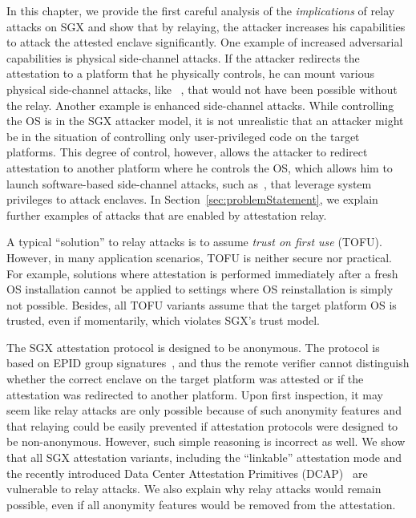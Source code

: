 In this chapter, we provide the first careful analysis of the \emph{implications} of relay attacks on SGX and show that by relaying, the attacker increases his capabilities to attack the attested enclave significantly. One example of increased adversarial capabilities is physical side-channel attacks. If the attacker redirects the attestation to a platform that he physically controls, he can mount various physical side-channel attacks, like ~\cite{genkin2016physical,wang2006covert,gandolfi2001electromagnetic, shamir2004acoustic}, that would not have been possible without the relay. Another example is enhanced side-channel attacks. While controlling the OS is in the SGX attacker model, it is not unrealistic that an attacker might be in the situation of controlling only user-privileged code on the target platforms. This degree of control, however, allows the attacker to redirect attestation to another platform where he controls the OS, which allows him to launch software-based side-channel attacks, such as~\cite{moghimi2017cachezoom, sgxcache, gotzfried2017cache}, that leverage system privileges to attack enclaves. In Section~\ref{sec:problemStatement}, we explain further examples of attacks that are enabled by attestation relay.



A typical ``solution'' to relay attacks is to assume \emph{trust on first use} (TOFU). However, in many application scenarios, TOFU is neither secure nor practical. For example, solutions where attestation is performed immediately after a fresh OS installation cannot be applied to settings where OS reinstallation is simply not possible. Besides, all TOFU variants assume that the target platform OS is trusted, even if momentarily, which violates SGX's trust model. %



The SGX attestation protocol is designed to be anonymous. The protocol is based on EPID group signatures~\cite{epid_attestation}, and thus the remote verifier cannot distinguish whether the correct enclave on the target platform was attested or if the attestation was redirected to another platform. Upon first inspection, it may seem like relay attacks are only possible because of such anonymity features and that relaying could be easily prevented if attestation protocols were designed to be non-anonymous. However, such simple reasoning is incorrect as well. 
%
We show that all SGX attestation variants, including the ``linkable'' attestation mode and the recently introduced Data Center Attestation Primitives (DCAP)~\cite{DCAP} are vulnerable to relay attacks. We also explain why relay attacks would remain possible, even if all anonymity features would be removed from the attestation.


